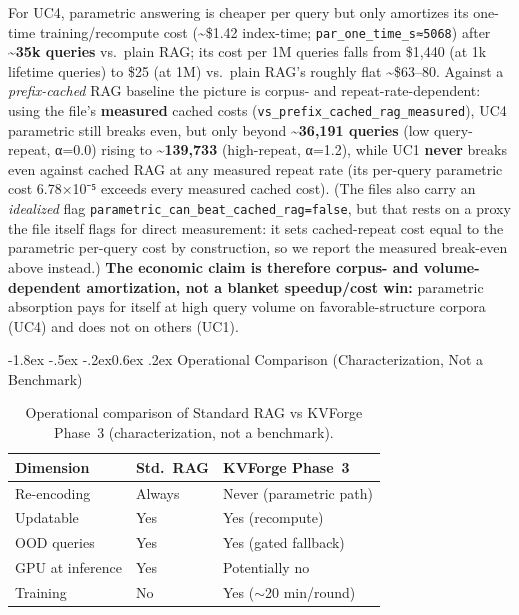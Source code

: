 \documentclass[10pt,twocolumn]{article}
\makeatletter
\renewcommand\subsection{\@startsection{subsection}{2}{\z@}%
  {-1.8ex \@plus -.5ex \@minus -.2ex}{0.6ex \@plus .2ex}%
  {\normalfont\normalsize\bfseries}}
\makeatother
\begin{document}
For UC4, parametric answering is cheaper per query but only amortizes its one-time training/recompute cost (\textasciitilde\$1.42 index-time; \texttt{par\_one\_time\_s≈5068}) after \textbf{\textasciitilde35k queries} vs.~plain RAG; its cost per 1M queries falls from \$1,440 (at 1k lifetime queries) to \$25 (at 1M) vs.~plain RAG's roughly flat \textasciitilde\$63--80. Against a \emph{prefix-cached} RAG baseline the picture is corpus- and repeat-rate-dependent: using the file's \textbf{measured} cached costs (\texttt{vs\_prefix\_cached\_rag\_measured}), UC4 parametric still breaks even, but only beyond \textbf{\textasciitilde36,191 queries} (low query-repeat, α=0.0) rising to \textbf{\textasciitilde139,733} (high-repeat, α=1.2), while UC1 \textbf{never} breaks even against cached RAG at any measured repeat rate (its per-query parametric cost 6.78×10⁻⁵ exceeds every measured cached cost). (The files also carry an \emph{idealized} flag \texttt{parametric\_can\_beat\_cached\_rag=false}, but that rests on a proxy the file itself flags for direct measurement: it sets cached-repeat cost equal to the parametric per-query cost by construction, so we report the measured break-even above instead.) \textbf{The economic claim is therefore corpus- and volume-dependent amortization, not a blanket speedup/cost win:} parametric absorption pays for itself at high query volume on favorable-structure corpora (UC4) and does not on others (UC1).

\hypertarget{operational-comparison-characterization-not-a-benchmark}{%
\subsection{Operational Comparison (Characterization, Not a Benchmark)}\label{operational-comparison-characterization-not-a-benchmark}}

\begin{table}[!htbp]
\centering
\caption{Operational comparison of Standard RAG vs KVForge Phase~3 (characterization, not a benchmark).}
\label{tab:ops}
\small
\begin{tabularx}{\columnwidth}{@{}L l L@{}}
\toprule
Dimension & Std.\ RAG & KVForge Phase~3 \\
\midrule
Re-encoding & Always & Never (parametric path) \\
Updatable & Yes & Yes (recompute) \\
OOD queries & Yes & Yes (gated fallback) \\
GPU at inference & Yes & Potentially no \\
Training & No & Yes ($\sim$20 min/round) \\
\bottomrule
\end{tabularx}
\end{table}
\end{document}
